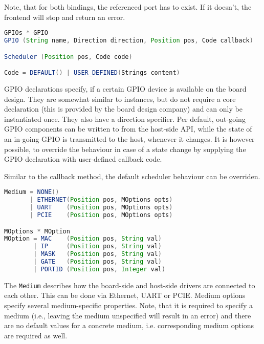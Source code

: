 \documentclass{report}
\begin{document}
Note, that for both bindings, the referenced port has to exist. If it doesn't, the frontend will stop and return an error. %

\begin{lstlisting}[language=java, breaklines=true]
GPIOs * GPIO
GPIO (String name, Direction direction, Position pos, Code callback)

Scheduler (Position pos, Code code)

Code = DEFAULT() | USER_DEFINED(Strings content)
\end{lstlisting}

GPIO declarations specify, if a certain GPIO device is available on the board design. They are somewhat similar to instances, but do not require a core declaration (this is provided by the board design company) and can only be instantiated once. They also have a direction specifier. Per default, out-going GPIO components can be written to from the host-side API, while the state of an in-going GPIO is transmitted to the host, whenever it changes. It is however possible, to override the behaviour in case of a state change by supplying the GPIO declaration with user-defined callback code. %

Similar to the callback method, the default scheduler behaviour can be overriden.

\begin{lstlisting}[language=java, breaklines=true]
Medium = NONE()
       | ETHERNET(Position pos, MOptions opts)
       | UART    (Position pos, MOptions opts)
       | PCIE    (Position pos, MOptions opts)

MOptions * MOption
MOption = MAC    (Position pos, String val)
        | IP     (Position pos, String val)
        | MASK   (Position pos, String val)
        | GATE   (Position pos, String val)
        | PORTID (Position pos, Integer val)
\end{lstlisting}

The \texttt{Medium} describes how the board-side and host-side drivers are connected to each other. This can be done via Ethernet, UART or PCIE. Medium options specify several medium-specific properties. Note, that it is required to specify a medium (i.e., leaving the medium unspecified will result in an error) and there are no default values for a concrete medium, i.e. corresponding medium options are required as well.
\end{document}
